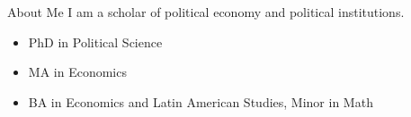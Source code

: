 \documentclass[11pt]{beamer}
\begin{document}

\begin{frame}[c]{About Me}
	I am a scholar of political economy and political institutions. \\
	\vspace{0.5cm}
	\begin{itemize}
		\pause \item PhD in Political Science
		\pause \item MA in Economics
		\pause \item BA in Economics and Latin American Studies, Minor in Math
	\end{itemize}
\end{frame}
\end{document}

